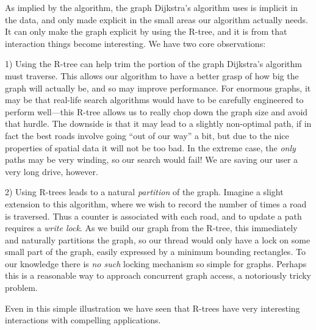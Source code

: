 As implied by the algorithm, the graph Dijkstra's algorithm uses is implicit in the data, and only made explicit in the small areas our algorithm actually needs.
It can only make the graph explicit by using the R-tree, and it is from that interaction things become interesting.
We have two core observations:

1) Using the R-tree can help trim the portion of the graph Dijkstra's algorithm must traverse.
This allows our algorithm to have a better grasp of how big the graph will actually be, and so may improve performance.
For enormous graphs, it may be that real-life search algorithms would have to be carefully engineered to perform well---this R-tree allows us to really chop down the graph size and avoid that hurdle.
The downside is that it may lead to a slightly non-optimal path, if in fact the best roads involve going ``out of our way'' a bit, but due to the nice properties of spatial data it will not be too bad.
In the extreme case, the \emph{only} paths may be very winding, so our search would fail!
We are saving our user a very long drive, however.

2) Using R-trees leads to a natural \emph{partition} of the graph.
Imagine a slight extension to this algorithm, where we wish to record the number of times a road is traversed.
Thus a counter is associated with each road, and to update a path requires a \emph{write lock}.
As we build our graph from the R-tree, this immediately and naturally partitions the graph, so our thread would only have a lock on some small part of the graph, easily expressed by a minimum bounding rectangles.
To our knowledge there is \emph{no such} locking mechanism so simple for graphs.
Perhaps this is a reasonable way to approach concurrent graph access, a notoriously tricky problem.

Even in this simple illustration we have seen that R-trees have very interesting interactions with compelling applications.

